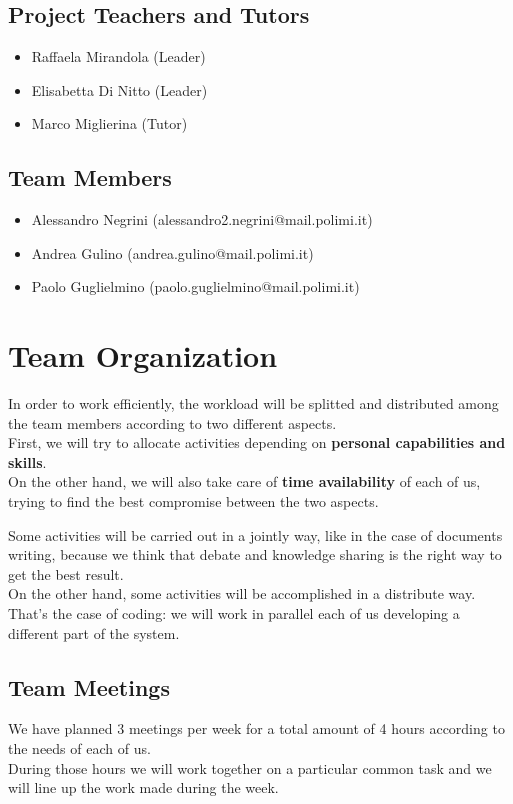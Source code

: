 \documentclass[12pt]{book}
\begin{document}
\section{Project Teachers and Tutors}
\begin{itemize}
	\item Raffaela Mirandola (Leader)
	\item Elisabetta Di Nitto (Leader)
	\item Marco Miglierina (Tutor)
\end{itemize}
\section{Team Members}
\begin{itemize}
	\item Alessandro Negrini (alessandro2.negrini@mail.polimi.it)
	\item Andrea Gulino (andrea.gulino@mail.polimi.it)
	\item	Paolo Guglielmino (paolo.guglielmino@mail.polimi.it)
\end{itemize}

\chapter{Team Organization}
In order to work efficiently, the workload will be splitted and distributed among the team members according to two different aspects. \\ 
First, we will try to allocate activities depending on \textbf{personal capabilities and skills}. \\ 
On the other hand, we will also take care of \textbf{time availability} of each of us, trying to find the best compromise between the two aspects. \\ \medskip

Some activities will be carried out in a jointly way, like in the case of documents writing, because we think that debate and knowledge sharing is the right way to get the best result. \\
On the other hand, some activities will be accomplished in a distribute way. That's the case of coding: we will work in parallel each of us developing a different part of the system. \\



\section{Team Meetings}
We have planned 3 meetings per week for a total amount of 4 hours according to the needs of each of us. \\
During those hours we will work together on a particular common task and we will line up the work made during the week. 
\end{document}
